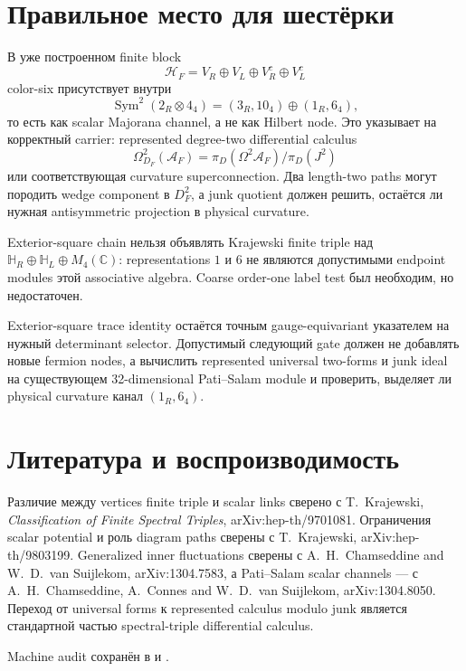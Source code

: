 \section{Правильное место для шестёрки}

В уже построенном finite block
\begin{equation}
 \mathcal H_F=V_R\oplus V_L\oplus V_R^c\oplus V_L^c
\end{equation}
color-six присутствует внутри
\begin{equation}
 \operatorname{Sym}^2(2_R\otimes4_4)
 =(3_R,10_4)\oplus(1_R,6_4),
\end{equation}
то есть как scalar Majorana channel, а не как Hilbert node. Это указывает
на корректный carrier: represented degree-two differential calculus
\begin{equation}
 \Omega^2_{D_F}(\mathcal A_F)
 =\pi_D(\Omega^2\mathcal A_F)/\pi_D(J^2)
\end{equation}
или соответствующая curvature superconnection. Два length-two paths могут
породить wedge component в \(D_F^2\), а junk quotient должен решить, остаётся
ли нужная antisymmetric projection в physical curvature.

\begin{nogocriterion}
Exterior-square chain нельзя объявлять Krajewski finite triple над
\(\mathbb H_R\oplus\mathbb H_L\oplus M_4(\mathbb C)\): representations
\(1\) и \(6\) не являются допустимыми endpoint modules этой associative
algebra. Coarse order-one label test был необходим, но недостаточен.
\end{nogocriterion}

\begin{proposition}
Exterior-square trace identity остаётся точным gauge-equivariant указателем
на нужный determinant selector. Допустимый следующий gate должен не добавлять
новые fermion nodes, а вычислить represented universal two-forms и junk ideal
на существующем 32-dimensional Pati--Salam module и проверить, выделяет ли
physical curvature канал \((1_R,6_4)\).
\end{proposition}

\section{Литература и воспроизводимость}

Различие между vertices finite triple и scalar links сверено с
T.~Krajewski, \emph{Classification of Finite Spectral Triples},
arXiv:hep-th/9701081. Ограничения scalar potential и роль diagram paths
сверены с T.~Krajewski, arXiv:hep-th/9803199. Generalized inner fluctuations
сверены с A.~H.~Chamseddine and W.~D.~van Suijlekom, arXiv:1304.7583, а
Pati--Salam scalar channels --- с A.~H.~Chamseddine, A.~Connes and
W.~D.~van Suijlekom, arXiv:1304.8050.
Переход от universal forms к represented calculus modulo junk является
стандартной частью spectral-triple differential calculus.

Machine audit сохранён в
 и
.